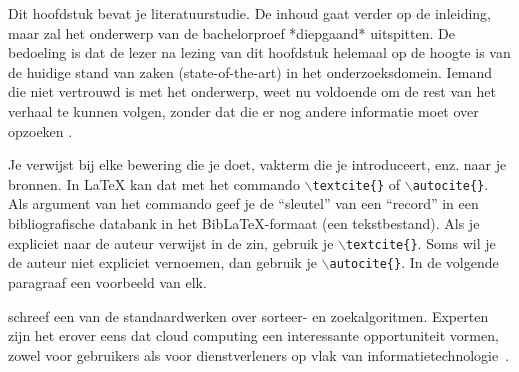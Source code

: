 Dit hoofdstuk bevat je literatuurstudie. De inhoud gaat verder op de inleiding, maar zal het onderwerp van de bachelorproef *diepgaand* uitspitten. De bedoeling is dat de lezer na lezing van dit hoofdstuk helemaal op de hoogte is van de huidige stand van zaken (state-of-the-art) in het onderzoeksdomein. Iemand die niet vertrouwd is met het onderwerp, weet nu voldoende om de rest van het verhaal te kunnen volgen, zonder dat die er nog andere informatie moet over opzoeken \autocite{Pollefliet2011}.

Je verwijst bij elke bewering die je doet, vakterm die je introduceert, enz. naar je bronnen. In \LaTeX{} kan dat met het commando \texttt{$\backslash${textcite\{\}}} of \texttt{$\backslash${autocite\{\}}}. Als argument van het commando geef je de ``sleutel'' van een ``record'' in een bibliografische databank in het Bib\LaTeX{}-formaat (een tekstbestand). Als je expliciet naar de auteur verwijst in de zin, gebruik je \texttt{$\backslash${}textcite\{\}}.
Soms wil je de auteur niet expliciet vernoemen, dan gebruik je \texttt{$\backslash${}autocite\{\}}. In de volgende paragraaf een voorbeeld van elk.

\textcite{Knuth1998} schreef een van de standaardwerken over sorteer- en zoekalgoritmen. Experten zijn het erover eens dat cloud computing een interessante opportuniteit vormen, zowel voor gebruikers als voor dienstverleners op vlak van informatietechnologie~\autocite{Creeger2009}.

\lipsum[7-20]

\fi
